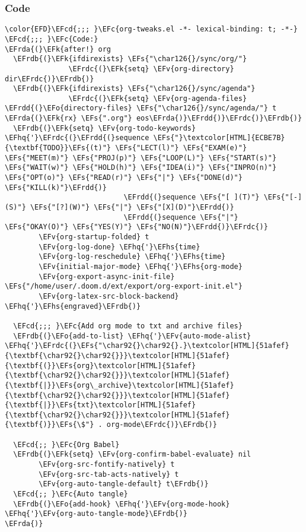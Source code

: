 \documentclass[a4wide,10pt]{article}
\newcommand{\EFc}[1]{\textcolor{EFc}{#1}} %
\newcommand{\EFcd}[1]{\textcolor{EFcd}{#1}} %
\newcommand{\EFs}[1]{\textcolor{EFs}{#1}} %
\newcommand{\EFk}[1]{\textcolor{EFk}{#1}} %
\newcommand{\EFv}[1]{\textcolor{EFv}{#1}} %
\newcommand{\EFo}[1]{\textcolor{EFo}{#1}} %
\newcommand{\EFhq}[1]{\textcolor{EFhq}{#1}} %
\newcommand{\EFhs}[1]{\textcolor{EFhs}{#1}} %
\newcommand{\EFrda}[1]{\textcolor{EFrda}{#1}} %
\newcommand{\EFrdb}[1]{\textcolor{EFrdb}{#1}} %
\newcommand{\EFrdc}[1]{\textcolor{EFrdc}{#1}} %
\newcommand{\EFrdd}[1]{\textcolor{EFrdd}{#1}} %
\begin{document}
\subsubsection{Code}
\label{sec:orgc00c02f}
\begin{Code}
\begin{Verbatim}
\color{EFD}\EFcd{;;; }\EFc{org-tweaks.el -*- lexical-binding: t; -*-}
\EFcd{;;; }\EFc{Code:}
\EFrda{(}\EFk{after!} org
  \EFrdb{(}\EFk{ifdirexists} \EFs{"\char126{}/sync/org/"}
               \EFrdc{(}\EFk{setq} \EFv{org-directory} dir\EFrdc{)}\EFrdb{)}
  \EFrdb{(}\EFk{ifdirexists} \EFs{"\char126{}/sync/agenda"}
               \EFrdc{(}\EFk{setq} \EFv{org-agenda-files} \EFrdd{(}\EFo{directory-files} \EFs{"\char126{}/sync/agenda/"} t \EFrda{(}\EFk{rx} \EFs{".org"} eos\EFrda{)}\EFrdd{)}\EFrdc{)}\EFrdb{)}
  \EFrdb{(}\EFk{setq} \EFv{org-todo-keywords} \EFhq{'}\EFrdc{(}\EFrdd{(}sequence \EFs{"}\textcolor[HTML]{ECBE7B}{\textbf{TODO}}\EFs{(t)"} \EFs{"LECT(l)"} \EFs{"EXAM(e)"} \EFs{"MEET(m)"} \EFs{"PROJ(p)"} \EFs{"LOOP(L)"} \EFs{"START(s)"} \EFs{"WAIT(w)"} \EFs{"HOLD(h)"} \EFs{"IDEA(i)"} \EFs{"INPRO(n)"} \EFs{"OPT(o)"} \EFs{"READ(r)"} \EFs{"|"} \EFs{"DONE(d)"} \EFs{"KILL(k)"}\EFrdd{)}
                            \EFrdd{(}sequence \EFs{"[ ](T)"} \EFs{"[-](S)"} \EFs{"[?](W)"} \EFs{"|"} \EFs{"[X](D)"}\EFrdd{)}
                            \EFrdd{(}sequence \EFs{"|"} \EFs{"OKAY(O)"} \EFs{"YES(Y)"} \EFs{"NO(N)"}\EFrdd{)}\EFrdc{)}
        \EFv{org-startup-folded} t
        \EFv{org-log-done} \EFhq{'}\EFhs{time}
        \EFv{org-log-reschedule} \EFhq{'}\EFhs{time}
        \EFv{initial-major-mode} \EFhq{'}\EFhs{org-mode}
        \EFv{org-export-async-init-file} \EFs{"/home/user/.doom.d/ext/export/org-export-init.el"}
        \EFv{org-latex-src-block-backend} \EFhq{'}\EFhs{engraved}\EFrdb{)}

  \EFcd{;;; }\EFc{Add org mode to txt and archive files}
  \EFrdb{(}\EFo{add-to-list} \EFhq{'}\EFv{auto-mode-alist} \EFhq{'}\EFrdc{(}\EFs{"\char92{}\char92{}.}\textcolor[HTML]{51afef}{\textbf{\char92{}\char92{}}}\textcolor[HTML]{51afef}{\textbf{(}}\EFs{org}\textcolor[HTML]{51afef}{\textbf{\char92{}\char92{}}}\textcolor[HTML]{51afef}{\textbf{|}}\EFs{org\_archive}\textcolor[HTML]{51afef}{\textbf{\char92{}\char92{}}}\textcolor[HTML]{51afef}{\textbf{|}}\EFs{txt}\textcolor[HTML]{51afef}{\textbf{\char92{}\char92{}}}\textcolor[HTML]{51afef}{\textbf{)}}\EFs{\$"} . org-mode\EFrdc{)}\EFrdb{)}

  \EFcd{;; }\EFc{Org Babel}
  \EFrdb{(}\EFk{setq} \EFv{org-confirm-babel-evaluate} nil
        \EFv{org-src-fontify-natively} t
        \EFv{org-src-tab-acts-natively} t
        \EFv{org-auto-tangle-default} t\EFrdb{)}
  \EFcd{;; }\EFc{Auto tangle}
  \EFrdb{(}\EFo{add-hook} \EFhq{'}\EFv{org-mode-hook} \EFhq{'}\EFv{org-auto-tangle-mode}\EFrdb{)}
\EFrda{)}


\end{Verbatim}
\end{Code}
\end{document}
